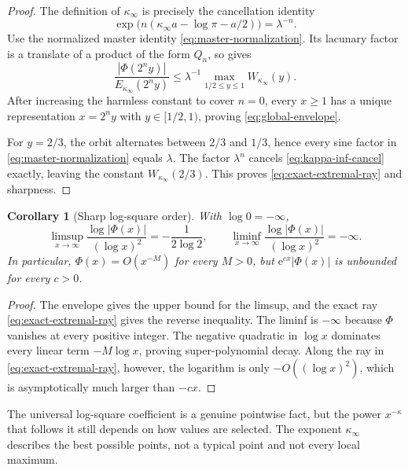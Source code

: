 \documentclass[11pt,oneside]{article}
\numberwithin{equation}{section}
\newtheorem{corollary}[theorem]{Corollary}
\theoremstyle{definition}
\theoremstyle{remark}
\newcommand{\e}{\mathrm e}
\newcommand{\abs}[1]{\left|#1\right|}
\newcommand{\PhiUp}{\Phi}
\begin{document}
\begin{proof}
The definition of \(\kappa_\infty\) is precisely the cancellation identity
\begin{equation}
 \exp\!\bigl(n(\kappa_\infty a-\log\pi-a/2)\bigr)=\lambda^{-n}.
 \label{eq:kappa-inf-cancel}
\end{equation}
Use the normalized master identity \eqref{eq:master-normalization}.  Its lacunary factor is
a translate of a product of the form \(Q_n\), so  gives
\[
 \frac{\abs{\PhiUp(2^ny)}}{E_{\kappa_\infty}(2^ny)}
 \le \lambda^{-1}\max_{1/2\le y\le1}W_{\kappa_\infty}(y).
\]
After increasing the harmless constant to cover \(n=0\), every \(x\ge1\) has a unique
representation \(x=2^ny\) with \(y\in[1/2,1)\), proving
\eqref{eq:global-envelope}.

For \(y=2/3\), the orbit alternates between \(2/3\) and \(1/3\), hence every sine factor
in \eqref{eq:master-normalization} equals \(\lambda\).  The factor \(\lambda^n\) cancels
\eqref{eq:kappa-inf-cancel} exactly, leaving the constant
\(W_{\kappa_\infty}(2/3)\).  This proves \eqref{eq:exact-extremal-ray} and sharpness.
\end{proof}

\begin{corollary}[Sharp log-square order]
\label{cor:log-square-order}
With \(\log0=-\infty\),
\begin{equation}
 \limsup_{x\to\infty}
 \frac{\log\abs{\PhiUp(x)}}{(\log x)^2}
 =-\frac1{2\log2},
 \qquad
 \liminf_{x\to\infty}
 \frac{\log\abs{\PhiUp(x)}}{(\log x)^2}=-\infty.
 \label{eq:log-square-order}
\end{equation}
In particular, \(\PhiUp(x)=O(x^{-M})\) for every \(M>0\), but
\(\e^{cx}\abs{\PhiUp(x)}\) is unbounded for every \(c>0\).
\end{corollary}

\begin{proof}
The envelope gives the upper bound for the limsup, and the exact ray
\eqref{eq:exact-extremal-ray} gives the reverse inequality.  The liminf is \(-\infty\)
because \(\PhiUp\) vanishes at every positive integer.  The negative quadratic in
\(\log x\) dominates every linear term \(-M\log x\), proving super-polynomial decay.
Along the ray in \eqref{eq:exact-extremal-ray}, however, the logarithm is only
\(-O((\log x)^2)\), which is asymptotically much larger than \(-cx\).
\end{proof}

\begin{meaningbox}
The universal log-square coefficient is a genuine pointwise fact, but the power
\(x^{-\kappa}\) that follows it still depends on how values are selected.  The exponent
\(\kappa_\infty\) describes the best possible points, not a typical point and not every
local maximum.
\end{meaningbox}
\end{document}
